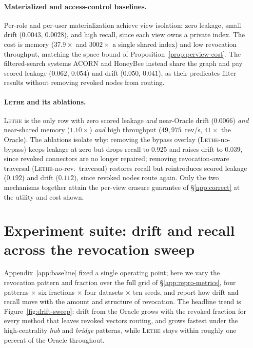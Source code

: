 \documentclass[sigconf, nonacm, review]{acmart}
\begin{document}
\paragraph{Materialized and access-control baselines.}
Per-role and per-user materialization achieve view isolation: zero leakage,
small drift ($0.0043$, $0.0028$), and high recall, since each view owns a
private index. The cost is memory ($37.9\times$ and $3002\times$ a single
shared index) and low revocation throughput, matching the space bound of
Proposition~\ref{prop:perview-cost}. The filtered-search systems ACORN and
HoneyBee instead share the graph and pay scored leakage ($0.062$, $0.054$) and
drift ($0.050$, $0.041$), as their predicates filter results without removing
revoked nodes from routing.

\paragraph{\textsc{Lethe} and its ablations.}
\textsc{Lethe} is the only row with zero scored leakage \emph{and} near-Oracle
drift ($0.0066$) \emph{and} near-shared memory ($1.10\times$) \emph{and} high
throughput ($49{,}975$~rev/s, $41\times$ the Oracle). The ablations isolate why:
removing the bypass overlay (\textsc{Lethe}-no-bypass) keeps leakage at zero but
drops recall to $0.925$ and raises drift to $0.039$, since revoked connectors
are no longer repaired; removing revocation-aware traversal
(\textsc{Lethe}-no-rev.\ traversal) restores recall but reintroduces scored
leakage ($0.192$) and drift ($0.112$), since revoked nodes route again. Only the
two mechanisms together attain the per-view erasure guarantee of
\S\ref{app:correct} at the utility and cost shown.


\section{Experiment suite: drift and recall across the revocation sweep}
\label{app:suite}

Appendix~\ref{app:baseline} fixed a single operating point; here we vary the
revocation pattern and fraction over the full grid of \S\ref{app:repro-metrics}, four patterns $\times$ six fractions $\times$ four datasets $\times$ ten
seeds, and report how drift and recall move with the amount and structure of
revocation. The headline trend is Figure~\ref{fig:drift-sweep}: drift from the
Oracle grows with the revoked fraction for every method that leaves revoked
vectors routing, and grows fastest under the high-centrality \emph{hub} and
\emph{bridge} patterns, while \textsc{Lethe} stays within roughly one percent of
the Oracle throughout.
\end{document}
